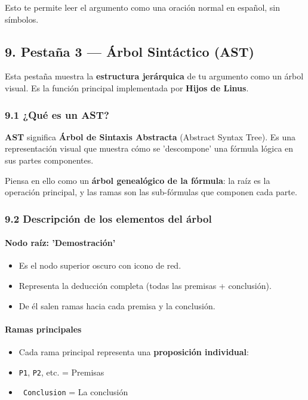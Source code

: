 \documentclass[11pt,a4paper]{article}
\begin{document}
Esto te permite leer el argumento como una oración normal en español, sin símbolos.

\hrulefill

\subsection{9. Pestaña 3 --- Árbol Sintáctico (AST)}

Esta pestaña muestra la \textbf{estructura jerárquica} de tu argumento como un árbol visual. Es la función principal implementada por \textbf{Hijos de Linus}.

\subsubsection{9.1 ¿Qué es un AST?}

\textbf{AST} significa \textbf{Árbol de Sintaxis Abstracta} (Abstract Syntax Tree). Es una representación visual que muestra cómo se 'descompone' una fórmula lógica en sus partes componentes.

Piensa en ello como un \textbf{árbol genealógico de la fórmula}: la raíz es la operación principal, y las ramas son las sub-fórmulas que componen cada parte.

\subsubsection{9.2 Descripción de los elementos del árbol}

\paragraph{Nodo raíz: 'Demostración'}
\begin{itemize}[leftmargin=*]
\item Es el nodo superior oscuro con icono de red.
\item Representa la deducción completa (todas las premisas + conclusión).
\item De él salen ramas hacia cada premisa y la conclusión.
\end{itemize}

\paragraph{Ramas principales}
\begin{itemize}[leftmargin=*]
\item Cada rama principal representa una \textbf{proposición individual}:
\item \texttt{P1}, \texttt{P2}, etc. = Premisas
\item \texttt{ Conclusion} = La conclusión
\end{itemize}
\end{document}
